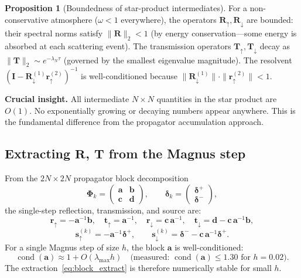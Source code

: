 \documentclass[11pt,a4paper]{article}
\newcommand{\cond}{\operatorname{cond}}
\newcommand{\vect}[1]{\bm{#1}}
\newcommand{\mat}[1]{\mathbf{#1}}
\theoremstyle{definition}
\newtheorem{proposition}{Proposition}
\begin{document}
\begin{proposition}[Boundedness of star-product intermediates]
For a non-conservative atmosphere ($\omega<1$ everywhere), the operators
$\mat{R}_\uparrow,\mat{R}_\downarrow$ are bounded: their spectral norms
satisfy $\|\mat{R}\|_2<1$ (by energy conservation---some energy is absorbed
at each scattering event).  The transmission operators
$\mat{T}_\uparrow,\mat{T}_\downarrow$ decay as
$\|\mat{T}\|_2\sim e^{-\lambda_N\tau}$ (governed by the smallest eigenvalue
magnitude).  The resolvent
$(\mat{I}-\mat{R}_\downarrow^{(1)}\mat{r}_\uparrow^{(2)})^{-1}$ is
well-conditioned because
$\|\mat{R}_\downarrow^{(1)}\|\cdot\|\mat{r}_\uparrow^{(2)}\|<1$.
\end{proposition}

\textbf{Crucial insight.}  All intermediate $N\times N$ quantities in the
star product are $O(1)$.  No exponentially growing or decaying numbers
appear anywhere.  This is the fundamental difference from the propagator
accumulation approach.

\subsection{Extracting $\mat{R}$, $\mat{T}$ from the Magnus step}
From the $2N\times 2N$ propagator block decomposition
\[
  \mat{\Phi}_k = \begin{pmatrix} \mat{a} & \mat{b} \\ \mat{c} & \mat{d}
  \end{pmatrix},
  \qquad
  \vect{\delta}_k = \begin{pmatrix} \vect{\delta}^+ \\ \vect{\delta}^- \end{pmatrix},
\]
the single-step reflection, transmission, and source are:
\begin{equation}\label{eq:block_extract}
  \mat{r}_\uparrow = -\mat{a}^{-1}\mat{b}, \quad
  \mat{t}_\uparrow = \mat{a}^{-1}, \quad
  \mat{r}_\downarrow = \mat{c}\,\mat{a}^{-1}, \quad
  \mat{t}_\downarrow = \mat{d}-\mat{c}\,\mat{a}^{-1}\mat{b},
\end{equation}
\[
  \vect{s}_\uparrow^{(k)} = -\mat{a}^{-1}\vect{\delta}^+, \qquad
  \vect{s}_\downarrow^{(k)} = \vect{\delta}^- - \mat{c}\,\mat{a}^{-1}\vect{\delta}^+.
\]
For a single Magnus step of size $h$, the block $\mat{a}$ is well-conditioned:
\begin{equation}
  \cond(\mat{a}) \approx 1 + O(\lambda_{\max}h)
  \quad\text{(measured: } \cond(\mat{a})\leq 1.30 \text{ for } h=0.02\text{).}
\end{equation}
The extraction~\eqref{eq:block_extract} is therefore numerically stable for
small $h$.
\end{document}
